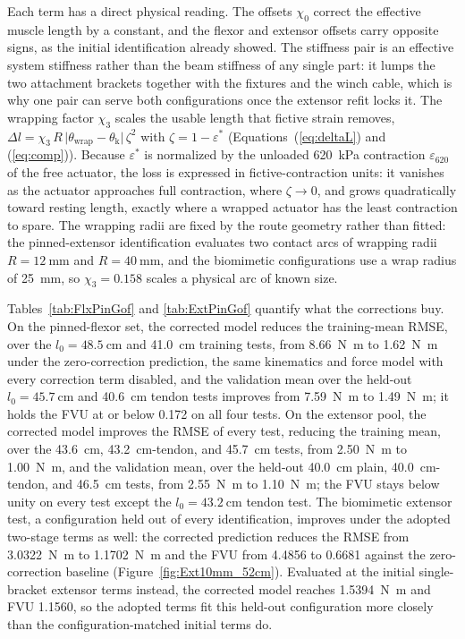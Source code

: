 \documentclass[utf8]{FrontiersinHarvard} %
\providecommand{\abs}[1]{\lvert#1\rvert}
\begin{document}
Each term has a direct physical reading. The offsets $\chi_{0}$ correct the effective muscle length by a constant, and the flexor and extensor offsets carry opposite signs, as the initial identification already showed. The stiffness pair is an effective system stiffness rather than the beam stiffness of any single part: it lumps the two attachment brackets together with the fixtures and the winch cable, which is why one pair can serve both configurations once the extensor refit locks it. The wrapping factor $\chi_{3}$ scales the usable length that fictive strain removes, $\Delta l = \chi_{3}\, R\, \abs{\theta_{\text{wrap}} - \theta_{\text{k}}}\, \zeta^{2}$ with $\zeta = 1 - \varepsilon^{*}$ (Equations~(\ref{eq:deltaL}) and (\ref{eq:comp})). Because $\varepsilon^{*}$ is normalized by the unloaded \qty{620}{\kPa} contraction $\varepsilon_{620}$ of the free actuator, the loss is expressed in fictive-contraction units: it vanishes as the actuator approaches full contraction, where $\zeta \to 0$, and grows quadratically toward resting length, exactly where a wrapped actuator has the least contraction to spare. The wrapping radii are fixed by the route geometry rather than fitted: the pinned-extensor identification evaluates two contact arcs of wrapping radii $R = \qty{12}{\mm}$ and $R = \qty{40}{\mm}$, and the biomimetic configurations use a wrap radius of \qty{25}{\mm}, so $\chi_{3} = 0.158$ scales a physical arc of known size.

Tables~\ref{tab:FlxPinGof} and \ref{tab:ExtPinGof} quantify what the corrections buy. On the pinned-flexor set, the corrected model reduces the training-mean RMSE, over the $l_{0}=\qty{48.5}{\cm}$ and \qty{41.0}{\cm} training tests, from \qty{8.66}{\newton\meter} to \qty{1.62}{\newton\meter} under the zero-correction prediction, the same kinematics and force model with every correction term disabled, and the validation mean over the held-out $l_{0}=\qty{45.7}{\cm}$ and \qty{40.6}{\cm} tendon tests improves from \qty{7.59}{\newton\meter} to \qty{1.49}{\newton\meter}; it holds the FVU at or below 0.172 on all four tests. On the extensor pool, the corrected model improves the RMSE of every test, reducing the training mean, over the \qty{43.6}{\cm}, \qty{43.2}{\cm}-tendon, and \qty{45.7}{\cm} tests, from \qty{2.50}{\newton\meter} to \qty{1.00}{\newton\meter}, and the validation mean, over the held-out \qty{40.0}{\cm} plain, \qty{40.0}{\cm}-tendon, and \qty{46.5}{\cm} tests, from \qty{2.55}{\newton\meter} to \qty{1.10}{\newton\meter}; the FVU stays below unity on every test except the $l_{0}=\qty{43.2}{\cm}$ tendon test. The biomimetic extensor test, a configuration held out of every identification, improves under the adopted two-stage terms as well: the corrected prediction reduces the RMSE from \qty{3.0322}{\newton\meter} to \qty{1.1702}{\newton\meter} and the FVU from 4.4856 to 0.6681 against the zero-correction baseline (Figure~\ref{fig:Ext10mm_52cm}). Evaluated at the initial single-bracket extensor terms instead, the corrected model reaches \qty{1.5394}{\newton\meter} and FVU 1.1560, so the adopted terms fit this held-out configuration more closely than the configuration-matched initial terms do.
\end{document}
